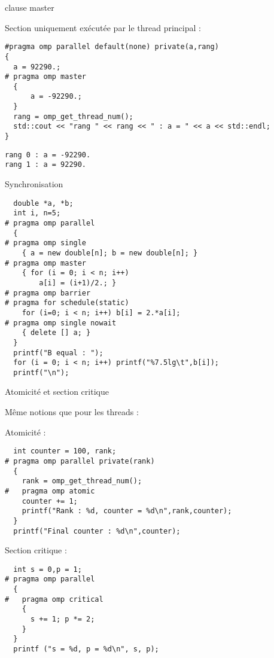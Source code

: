\documentclass[handout,francais]{beamer}
\begin{document}
\begin{frame}[fragile]{clause master}

Section uniquement exécutée par le thread principal :
\begin{lstlisting}
#pragma omp parallel default(none) private(a,rang)
{
  a = 92290.;
# pragma omp master
  {
      a = -92290.;
  }
  rang = omp_get_thread_num();
  std::cout << "rang " << rang << " : a = " << a << std::endl;
}
\end{lstlisting}

\begin{verbatim}
rang 0 : a = -92290.
rang 1 : a = 92290.
\end{verbatim}
\end{frame}

\begin{frame}[fragile]{Synchronisation}
 
\begin{lstlisting}
  double *a, *b;
  int i, n=5;
# pragma omp parallel
  {
# pragma omp single
    { a = new double[n]; b = new double[n]; }
# pragma omp master
    { for (i = 0; i < n; i++)
        a[i] = (i+1)/2.; }
# pragma omp barrier
# pragma for schedule(static)
    for (i=0; i < n; i++) b[i] = 2.*a[i];
# pragma omp single nowait
    { delete [] a; }
  }
  printf("B equal : ");
  for (i = 0; i < n; i++) printf("%7.5lg\t",b[i]);
  printf("\n");
\end{lstlisting}

\end{frame}

\begin{frame}[fragile]{Atomicité et section critique}

{\scriptsize
Même notions que pour les threads :

Atomicité :
 \begin{lstlisting}
  int counter = 100, rank;
# pragma omp parallel private(rank)
  {
    rank = omp_get_thread_num();
#   pragma omp atomic
    counter += 1;    
    printf("Rank : %d, counter = %d\n",rank,counter);
  }
  printf("Final counter : %d\n",counter);
\end{lstlisting}

Section critique :
\begin{lstlisting}
  int s = 0,p = 1;
# pragma omp parallel
  {
#   pragma omp critical
    {
      s += 1; p *= 2;
    }
  }
  printf ("s = %d, p = %d\n", s, p);
\end{lstlisting}
}

\end{frame}
\end{document}
